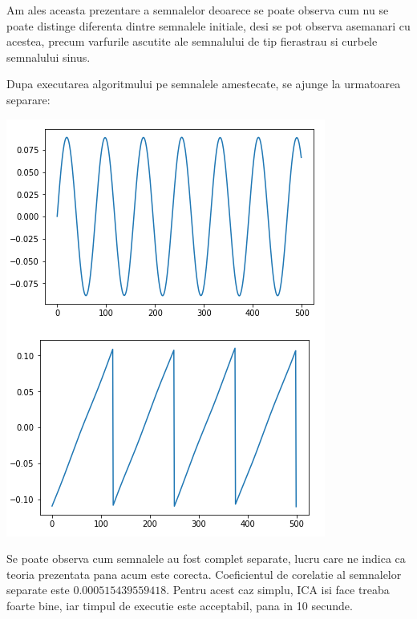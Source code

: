 \documentclass[12pt,oneside]{article}
\begin{document}
Am ales aceasta prezentare a semnalelor deoarece se poate observa cum nu se poate distinge diferenta dintre semnalele initiale, desi se pot observa asemanari cu acestea, precum varfurile ascutite ale semnalului de tip fierastrau si curbele semnalului sinus. 

Dupa executarea algoritmului pe semnalele amestecate, se ajunge la urmatoarea separare:
\begin{center}
	\includegraphics[scale=1]{primitives_separated}
 \end{center}

Se poate observa cum semnalele au fost complet separate, lucru care ne indica ca teoria prezentata pana acum este corecta. Coeficientul de corelatie al semnalelor separate este $0.000515439559418$. Pentru acest caz simplu, ICA isi face treaba foarte bine, iar timpul de executie este acceptabil, pana in 10 secunde.
\end{document}
